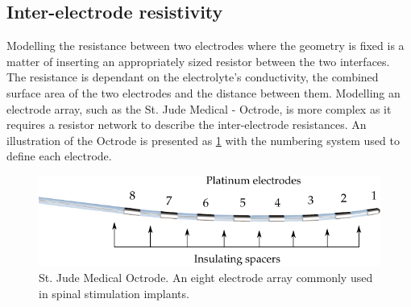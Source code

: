   \subsection{Inter-electrode resistivity}

    Modelling the resistance between two electrodes where the geometry is fixed is a matter of inserting an appropriately sized resistor between the two interfaces.
    The resistance is dependant on the electrolyte's conductivity, the combined surface area of the two electrodes and the distance between them.
    Modelling an electrode array, such as the St. Jude Medical - Octrode, is more complex as it requires a resistor network to describe the inter-electrode resistances.
    An illustration of the Octrode is presented as \cref{fig:StJudeOctrode_Labelled} with the numbering system used to define each electrode.

    \begin{figure}
      \centering
      \includegraphics{content/pt2/07-InterfaceModel/graphics/StJudeOctrodeDiagram}
      \caption{\label{fig:StJudeOctrode_Labelled}St. Jude Medical Octrode. An eight electrode array commonly used in spinal stimulation implants.}
    \end{figure}




